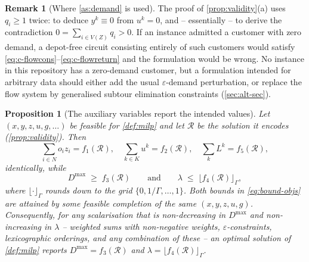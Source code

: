 \documentclass[11pt,a4paper]{article}
\theoremstyle{definition}
\newtheorem{remark}[definition]{Remark}
\theoremstyle{plain}
\newtheorem{proposition}[definition]{Proposition}
\newcommand{\Routes}{\mathcal{R}}
\newcommand{\Cust}{N}
\newcommand{\Veh}{K}
\newcommand{\Dmax}{D^{\max}}
\begin{document}
\begin{remark}[Where \cref{as:demand} is used]
\label{rem:demand-needed}
The proof of \cref{prop:validity}(a) uses $q_i \ge 1$ twice: to deduce
$y^k \equiv 0$ from $u^k = 0$, and -- essentially -- to derive the
contradiction $0 = \sum_{i \in V(Z)} q_i > 0$.  If an instance admitted a
customer with zero demand, a depot-free circuit consisting entirely of such
customers would satisfy \eqref{eq:c-flowcons}--\eqref{eq:c-flowreturn} and the
formulation would be wrong.  No instance in this repository has a zero-demand
customer, but a formulation intended for arbitrary data should either add the
usual $\varepsilon$-demand perturbation, or replace the flow system by
generalised subtour elimination constraints (\cref{sec:alt-sec}).
\end{remark}

\begin{proposition}[The auxiliary variables report the intended values]
\label{prop:tightness}
Let $(x,y,z,u,g,\dots)$ be feasible for \cref{def:milp} and let $\Routes$ be the
solution it encodes (\cref{prop:validity}).  Then
\begin{equation}
  \sum_{i \in \Cust} o_i z_i = f_1(\Routes), \quad
  \sum_{k \in \Veh} u^k = f_2(\Routes), \quad
  \sum_{k} L^k = f_5(\Routes),
  \label{eq:exact-objs}
\end{equation}
identically, while
\begin{equation}
  \Dmax \;\ge\; f_3(\Routes)
  \qquad\text{and}\qquad
  \lambda \;\le\; \bigl\lfloor f_4(\Routes) \bigr\rfloor_{\Gamma},
  \label{eq:bound-objs}
\end{equation}
where $\lfloor \cdot \rfloor_{\Gamma}$ rounds down to the grid
$\{0, 1/\Gamma, \dots, 1\}$.  Both bounds in \eqref{eq:bound-objs} are attained
by some feasible completion of the same $(x,y,z,u,g)$.  Consequently, for any
scalarisation that is non-decreasing in $\Dmax$ and non-increasing in
$\lambda$ -- weighted sums with non-negative weights, $\varepsilon$-constraints,
lexicographic orderings, and any combination of these -- an optimal solution of
\cref{def:milp} reports $\Dmax = f_3(\Routes)$ and
$\lambda = \lfloor f_4(\Routes) \rfloor_{\Gamma}$.
\end{proposition}
\end{document}
